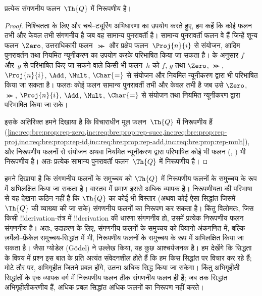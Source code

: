 \documentclass[../../../include/open-logic-section]{subfiles}
\begin{document}

\begin{thm}
प्रत्येक संगणनीय फलन~$\Th{Q}$ में निरूपणीय है।
\end{thm}

\begin{proof}
निश्चितता के लिए और चर्च--ट्यूरिंग अभिधारणा का उपयोग करते हुए, हम कहें कि
कोई फलन तभी और केवल तभी संगणनीय है जब वह सामान्य पुनरावर्ती है। सामान्य
पुनरावर्ती फलन वे हैं जिन्हें शून्य फलन~$\Zero$, उत्तराधिकारी फलन~$\Succ$
और प्रक्षेप फलन~$\Proj{n}{i}$ से संयोजन, आदिम पुनरावर्तन तथा नियमित
न्यूनीकरण का उपयोग करके परिभाषित किया जा सकता है।
 के अनुसार $f$ और~$g$ से परिभाषित किए जा सकने वाले
किसी भी फलन~$h$ को $f$, $g$ तथा $\Zero$, $\Succ$, $\Proj{n}{i}$, $\Add$,
$\Mult$, $\Char{=}$ से संयोजन और नियमित न्यूनीकरण द्वारा भी परिभाषित किया
जा सकता है। फलतः कोई फलन सामान्य पुनरावर्ती तभी और केवल तभी है जब उसे
$\Zero$, $\Succ$, $\Proj{n}{i}$, $\Add$, $\Mult$, $\Char{=}$ से संयोजन तथा
नियमित न्यूनीकरण द्वारा परिभाषित किया जा सके।

इसके अतिरिक्त हमने दिखाया है कि विचाराधीन मूल फलन~$\Th{Q}$ में निरूपणीय
हैं
(\cref{inc:req:bre:prop:rep-zero,inc:req:bre:prop:rep-succ,inc:req:bre:prop:rep-proj,inc:req:bre:prop:rep-id,inc:req:bre:prop:rep-add,inc:req:bre:prop:rep-mult}),
और निरूपणीय फलनों से संयोजन अथवा नियमित न्यूनीकरण द्वारा परिभाषित कोई भी
फलन
(,
) भी निरूपणीय है। अतः प्रत्येक सामान्य
पुनरावर्ती फलन~$\Th{Q}$ में निरूपणीय है।
\end{proof}

\begin{explain}
हमने दिखाया है कि संगणनीय फलनों के समुच्चय को $\Th{Q}$ में निरूपणीय फलनों
के समुच्चय के रूप में अभिलक्षित किया जा सकता है। वास्तव में प्रमाण इससे
अधिक व्यापक है। निरूपणीयता की परिभाषा से यह देखना कठिन नहीं है कि
$\Th{Q}$ का कोई भी विस्तार (अथवा कोई ऐसा सिद्धांत जिसमें $\Th{Q}$ की
व्याख्या की जा सके) संगणनीय फलनों का निरूपण कर सकता है। किंतु विलोमतः,
जिस किसी !!{derivation}-तंत्र में !!{derivation} की धारणा संगणनीय हो, उसमें
प्रत्येक निरूपणीय फलन संगणनीय है। अतः, उदाहरण के लिए, संगणनीय फलनों के
समुच्चय को पियानो अंकगणित में, बल्कि ज़र्मेलो--फ्रेंकेल समुच्चय-सिद्धांत
में भी, निरूपणीय फलनों के समुच्चय के रूप में अभिलक्षित किया जा सकता है।
जैसा ग्योडेल (G\"odel) ने उल्लेख किया, यह कुछ आश्चर्यजनक है। हम देखेंगे कि
सिद्धता के विषय में प्रश्न इस बात के प्रति अत्यंत संवेदनशील होते हैं कि हम
किस सिद्धांत पर विचार कर रहे हैं; मोटे तौर पर, अभिगृहीत जितने प्रबल होंगे,
उतना अधिक सिद्ध किया जा सकेगा। किंतु अभिगृहीती सिद्धांतों के एक व्यापक
वर्ग में निरूपणीय फलन ठीक संगणनीय फलन ही हैं; जब तक सिद्धांत
अभिगृहीतीकरणीय हैं, अधिक प्रबल सिद्धांत अधिक फलनों का निरूपण नहीं करते।
\end{explain}
\end{document}
